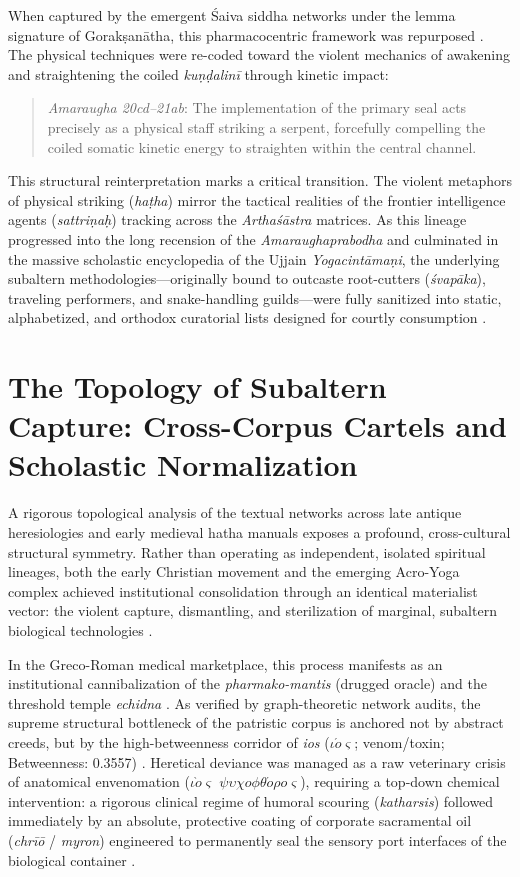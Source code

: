 \documentclass[11pt,letterpaper]{article}
\begin{document}
When captured by the emergent Śaiva siddha networks under the lemma signature of Gorakṣanātha, this pharmacocentric framework was repurposed \cite{Birch2024}. The physical techniques were re-coded toward the violent mechanics of awakening and straightening the coiled \textit{kuṇḍalinī} through kinetic impact:
\begin{quote}
    \textit{Amaraugha 20cd--21ab}: The implementation of the primary seal acts precisely as a physical staff striking a serpent, forcefully compelling the coiled somatic kinetic energy to straighten within the central channel. \cite{Birch2024}
\end{quote}
This structural reinterpretation marks a critical transition. The violent metaphors of physical striking (\textit{haṭha}) mirror the tactical realities of the frontier intelligence agents (\textit{sattriṇaḥ}) tracking across the \textit{Arthaśāstra} matrices. As this lineage progressed into the long recension of the \textit{Amaraughaprabodha} and culminated in the massive scholastic encyclopedia of the Ujjain \textit{Yogacintāmaṇi}, the underlying subaltern methodologies—originally bound to outcaste root-cutters (\textit{śvapāka}), traveling performers, and snake-handling guilds—were fully sanitized into static, alphabetized, and orthodox curatorial lists designed for courtly consumption \cite{Birch2024}.

\section{The Topology of Subaltern Capture: Cross-Corpus Cartels and Scholastic Normalization}

A rigorous topological analysis of the textual networks across late antique heresiologies and early medieval hatha manuals exposes a profound, cross-cultural structural symmetry. Rather than operating as independent, isolated spiritual lineages, both the early Christian movement and the emerging Acro-Yoga complex achieved institutional consolidation through an identical materialist vector: the violent capture, dismantling, and sterilization of marginal, subaltern biological technologies \cite{Birch2024, McCartney2026}. 

In the Greco-Roman medical marketplace, this process manifests as an institutional cannibalization of the \textit{pharmako-mantis} (drugged oracle) and the threshold temple \textit{echidna} \cite{McCartney2026}. As verified by graph-theoretic network audits, the supreme structural bottleneck of the patristic corpus is anchored not by abstract creeds, but by the high-betweenness corridor of \textit{ios} ($\iota\acute{o}\varsigma$; venom/toxin; Betweenness: 0.3557) \cite{McCartney2026}. Heretical deviance was managed as a raw veterinary crisis of anatomical envenomation ($\iota\grave{o}\varsigma$ $\psi\upsilon\chi o\phi\theta\acute{o}\rho o\varsigma$), requiring a top-down chemical intervention: a rigorous clinical regime of humoral scouring (\textit{katharsis}) followed immediately by an absolute, protective coating of corporate sacramental oil (\textit{chrīō} / \textit{myron}) engineered to permanently seal the sensory port interfaces of the biological container \cite{McCartney2026}.
\end{document}
